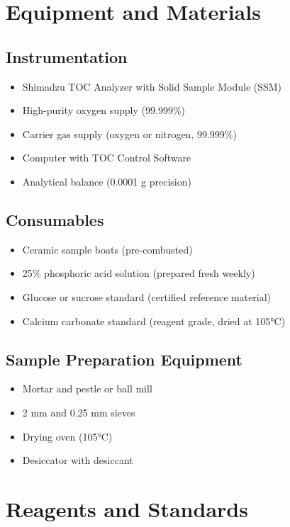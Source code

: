 \documentclass[11pt,a4paper]{article}\usepackage[]{graphicx}\usepackage[]{xcolor}
\begin{document}
\section{Equipment and Materials}

\subsection{Instrumentation}
\begin{itemize}[noitemsep]
    \item Shimadzu TOC Analyzer with Solid Sample Module (SSM)
    \item High-purity oxygen supply (99.999\%)
    \item Carrier gas supply (oxygen or nitrogen, 99.999\%)
    \item Computer with TOC Control Software
    \item Analytical balance (0.0001 g precision)
\end{itemize}

\subsection{Consumables}
\begin{itemize}[noitemsep]
    \item Ceramic sample boats (pre-combusted)
    \item 25\% phosphoric acid solution (prepared fresh weekly)
    \item Glucose or sucrose standard (certified reference material)
    \item Calcium carbonate standard (reagent grade, dried at 105°C)
\end{itemize}

\subsection{Sample Preparation Equipment}
\begin{itemize}[noitemsep]
    \item Mortar and pestle or ball mill
    \item 2 mm and 0.25 mm sieves
    \item Drying oven (105°C)
    \item Desiccator with desiccant
\end{itemize}

\section{Reagents and Standards}
\end{document}
